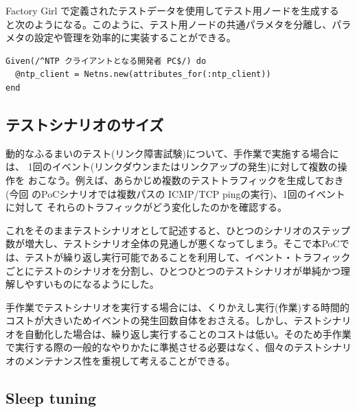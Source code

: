 Factory Girl で定義されたテストデータを使用してテスト用ノードを生成する
と次のようになる。このように、テスト用ノードの共通パラメタを分離し、パラ
メタの設定や管理を効率的に実装することができる。
\begin{lstlisting}
Given(/^NTP クライアントとなる開発者 PC$/) do
  @ntp_client = Netns.new(attributes_for(:ntp_client))
end
\end{lstlisting}

  \subsection{テストシナリオのサイズ}


動的なふるまいのテスト(リンク障害試験)について、手作業で実施する場合には、
1回のイベント(リンクダウンまたはリンクアップの発生)に対して複数の操作を
おこなう。例えば、あらかじめ複数のテストトラフィックを生成しておき(今回
のPoCシナリオでは複数パスの ICMP/TCP pingの実行)、1回のイベントに対して
それらのトラフィックがどう変化したのかを確認する。

これをそのままテストシナリオとして記述すると、ひとつのシナリオのステップ
数が増大し、テストシナリオ全体の見通しが悪くなってしまう。そこで本PoCで
は、テストが繰り返し実行可能であることを利用して、イベント・トラフィック
ごとにテストのシナリオを分割し、ひとつひとつのテストシナリオが単純かつ理
解しやすいものになるようにした。

手作業でテストシナリオを実行する場合には、くりかえし実行(作業)する時間的
コストが大きいためイベントの発生回数自体をおさえる。しかし、テストシナリ
オを自動化した場合は、繰り返し実行することのコストは低い。そのため手作業
で実行する際の一般的なやりかたに準拠させる必要はなく、個々のテストシナリ
オのメンテナンス性を重視して考えることができる。

  \subsection{Sleep tuning}
  \label{sec:sleep-tuning}

